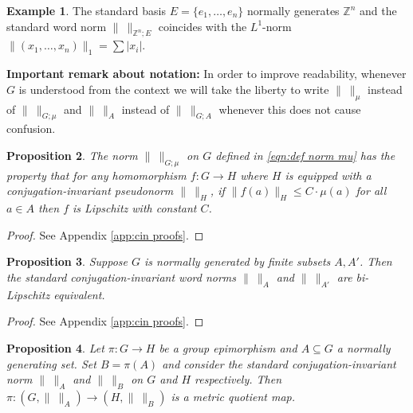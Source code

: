 \documentclass[12pt]{amsart}
\newtheorem{prop}{Proposition}[section]
\theoremstyle{definition}
\newtheorem{example}[prop]{Example}
\def\ZZ{\ensuremath{\mathbb{Z}}}
\newcommand{\OP}[1]{\operatorname{#1}}
\begin{document}
\begin{example}\label{example:standard Zn L1}
The standard basis $E=\{e_1,\dots,e_n\}$ normally generates $\ZZ^n$ and the standard word norm $\| \ \|_{\ZZ^n;E}$ coincides with the $L^1$-norm $\| (x_1,\dots,x_n)\|_1=\sum |x_i|$.
\end{example}




\medskip
\noindent
{\bf Important remark about notation:}
In order to improve readability, whenever $G$ is understood from the context we will take the liberty to write $\| \ \|_\mu$ instead of $\| \ \|_{G;\mu}$ and $\| \ \|_A$ instead of $\| \ \|_{G;A}$ whenever this does not cause confusion.






\begin{prop}\label{P:norm-mu universally Lipschitz}
The norm $\| \ \|_{G;\mu}$ on $G$ defined in \eqref{eqn:def norm mu} has the property that for any homomorphism $f \colon G \to H$ where $H$ is equipped with a conjugation-invariant pseudonorm $\| \ \|_H$, if $\|f(a)\|_H \leq C \cdot \mu(a)$ for all $a \in A$ then $f$ is Lipschitz with constant $C$.
\end{prop}


\begin{proof}
See Appendix \ref{app:cin proofs}.
\end{proof}





\begin{prop}\label{prop:finite generating sets bi lipschitz equivalence}
Suppose $G$ is normally generated by finite subsets $A,A'$.
Then the standard conjugation-invariant word norms $\| \ \|_A$ and $\| \ \|_{A'}$ are bi-Lipschitz equivalent.
\end{prop}

\begin{proof}
See Appendix \ref{app:cin proofs}.

\end{proof}



\begin{prop}\label{prop:quotient of canonical word norms}
Let $\pi \colon G \to H$ be a group epimorphism and $A \subseteq G$ a normally generating set.
Set $B=\pi(A)$ and consider the standard conjugation-invariant norm $\| \ \|_A$ and $\| \ \|_B$ on $G$ and $H$ respectively.
Then $\pi \colon (G,\| \ \|_A) \to (H,\| \ \|_B)$ is a metric quotient map.
\end{prop}
\end{document}
